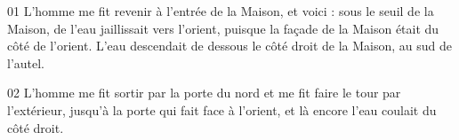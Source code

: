 01 L’homme me fit revenir à l’entrée de la Maison, et voici : sous le seuil de la Maison, de l’eau jaillissait vers l’orient, puisque la façade de la Maison était du côté de l’orient. L’eau descendait de dessous le côté droit de la Maison, au sud de l’autel.

02 L’homme me fit sortir par la porte du nord et me fit faire le tour par l’extérieur, jusqu’à la porte qui fait face à l’orient, et là encore l’eau coulait du côté droit.
